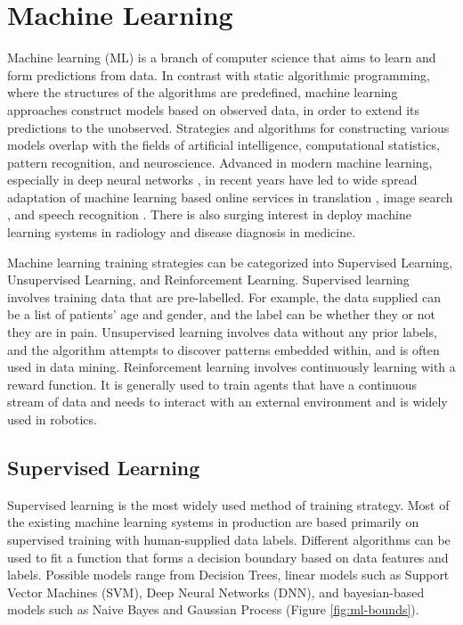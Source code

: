 \section{Machine Learning}
Machine learning (ML) is a branch of computer science that aims to learn and form predictions from data. In contrast with static algorithmic programming, where the structures of the algorithms are predefined, machine learning approaches construct models based on observed data, in order to extend its predictions to the unobserved. Strategies and algorithms for constructing various models overlap with the fields of artificial intelligence, computational statistics, pattern recognition, and neuroscience. Advanced in modern machine learning, especially in deep neural networks \cite{LeCun2015}, in recent years have led to wide spread adaptation of machine learning based online services in translation \cite{bahdanau2014neural}, image search \cite{simonyan2014very}, and speech recognition \cite{graves2013speech}. There is also surging interest in deploy machine learning systems in radiology and disease diagnosis in medicine\cite{Kamnitsas2016,Suk2014}.

Machine learning training strategies can be categorized into Supervised Learning, Unsupervised Learning, and Reinforcement Learning. Supervised learning involves training data that are pre-labelled. For example, the data supplied can be a list of patients' age and gender, and the label can be whether they or not they are in pain. Unsupervised learning involves data without any prior labels, and the algorithm attempts to discover patterns embedded within, and is often used in data mining. Reinforcement learning involves continuously learning with a reward function. It is generally used to train agents that have a continuous stream of data and needs to interact with an external environment and is widely used in robotics.

\subsection{Supervised Learning}
Supervised learning is the most widely used method of training strategy. Most of the existing machine learning systems in production are based primarily on supervised training with human-supplied data labels. Different algorithms can be used to fit a function that forms a decision boundary based on data features and labels. Possible models range from Decision Trees, linear models such as Support Vector Machines (SVM), Deep Neural Networks (DNN), and bayesian-based models such as Naive Bayes and Gaussian Process (Figure \ref{fig:ml-bounds}).


